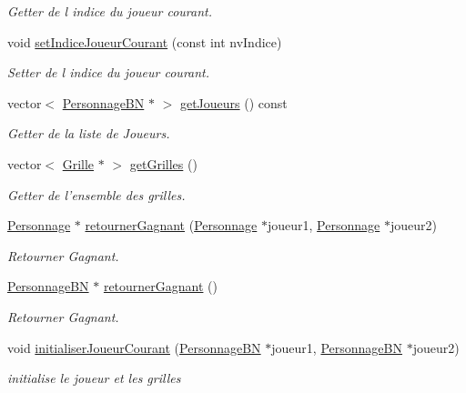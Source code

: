 \begin{DoxyCompactItemize}
\begin{DoxyCompactList}\small\item\em Getter de l indice du joueur courant. \end{DoxyCompactList}\item 
void \hyperlink{classBatailleNavale_a7afd1b0024f7e3df851880ce63289b21}{set\-Indice\-Joueur\-Courant} (const int nv\-Indice)
\begin{DoxyCompactList}\small\item\em Setter de l indice du joueur courant. \end{DoxyCompactList}\item 
vector$<$ \hyperlink{classPersonnageBN}{Personnage\-B\-N} $\ast$ $>$ \hyperlink{classBatailleNavale_a9fadbc201334aac3d7e181363483f12c}{get\-Joueurs} () const 
\begin{DoxyCompactList}\small\item\em Getter de la liste de Joueurs. \end{DoxyCompactList}\item 
vector$<$ \hyperlink{classGrille}{Grille} $\ast$ $>$ \hyperlink{classBatailleNavale_a2834333a3f934ea4d25f6f09139e740e}{get\-Grilles} ()
\begin{DoxyCompactList}\small\item\em Getter de l'ensemble des grilles. \end{DoxyCompactList}\item 
\hyperlink{classPersonnage}{Personnage} $\ast$ \hyperlink{classBatailleNavale_acff7cd9717a2ed3084b232d95ea9042a}{retourner\-Gagnant} (\hyperlink{classPersonnage}{Personnage} $\ast$joueur1, \hyperlink{classPersonnage}{Personnage} $\ast$joueur2)
\begin{DoxyCompactList}\small\item\em Retourner Gagnant. \end{DoxyCompactList}\item 
\hyperlink{classPersonnageBN}{Personnage\-B\-N} $\ast$ \hyperlink{classBatailleNavale_a6dd55fdc58c85d5fc7d2aceec872dcc0}{retourner\-Gagnant} ()
\begin{DoxyCompactList}\small\item\em Retourner Gagnant. \end{DoxyCompactList}\item 
void \hyperlink{classBatailleNavale_a503ea394595b67fb2101dc5a77c46e7c}{initialiser\-Joueur\-Courant} (\hyperlink{classPersonnageBN}{Personnage\-B\-N} $\ast$joueur1, \hyperlink{classPersonnageBN}{Personnage\-B\-N} $\ast$joueur2)
\begin{DoxyCompactList}\small\item\em initialise le joueur et les grilles \end{DoxyCompactList}\end{DoxyCompactItemize}


